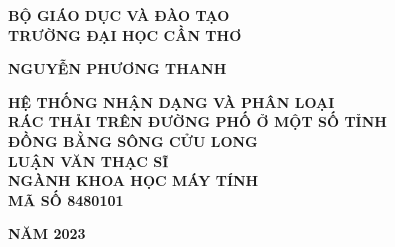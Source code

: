 \documentclass[../the.tex]{subfiles}
\begin{document}
\begin{titlepage}

\begin{center}
\thispagestyle{empty}
{\fontsize{14}{14}\selectfont \textbf{BỘ GIÁO DỤC VÀ ĐÀO TẠO}\\
\textbf{TRƯỜNG ĐẠI HỌC CẦN THƠ}\\[3cm]
}

{\fontsize{14}{14}\selectfont \textbf{NGUYỄN PHƯƠNG THANH}
}\\[3cm]



\begin{large}
\end{large}
{\fontsize{20}{12}\selectfont
\textbf{{HỆ THỐNG NHẬN DẠNG VÀ PHÂN LOẠI
 \\ RÁC THẢI TRÊN ĐƯỜNG PHỐ Ở MỘT SỐ TỈNH \\ ĐỒNG BẰNG SÔNG CỬU LONG
}}}
\\[4cm]

{\fontsize{14}{14}\selectfont \textbf{LUẬN VĂN THẠC SĨ}\\
\textbf{NGÀNH KHOA HỌC MÁY TÍNH\\MÃ SỐ 8480101\\[6cm]}
}

{\fontsize{14}{12}\selectfont
\textbf{NĂM 2023}}

\end{center}

\end{titlepage}
\end{document}

